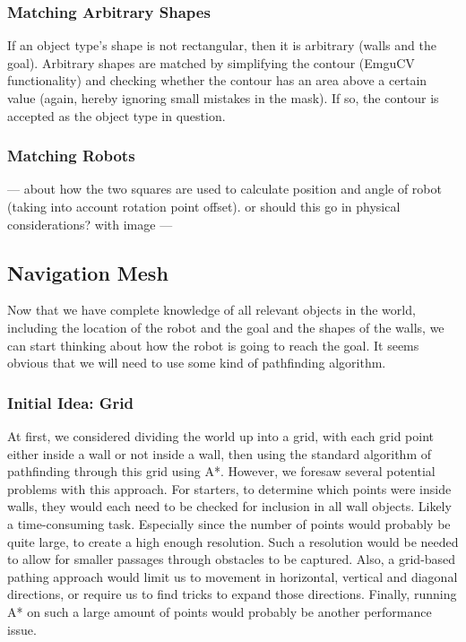 \documentclass[10pt,twocolumn]{scrartcl}
\begin{document}
\subsubsection{Matching Arbitrary Shapes}
If an object type's shape is not rectangular, then it is arbitrary (walls and the goal). Arbitrary shapes are matched by simplifying the contour (EmguCV functionality) and checking whether the contour has an area above a certain value (again, hereby ignoring small mistakes in the mask). If so, the contour is accepted as the object type in question.

\subsubsection{Matching Robots}
---
about how the two squares are used to calculate position and angle of robot (taking into account rotation point offset). or should this go in physical considerations? with image
---

\subsection{Navigation Mesh}
Now that we have complete knowledge of all relevant objects in the world, including the location of the robot and the goal and the shapes of the walls, we can start thinking about how the robot is going to reach the goal. It seems obvious that we will need to use some kind of pathfinding algorithm.

\subsubsection{Initial Idea: Grid}
At first, we considered dividing the world up into a grid, with each grid point either inside a wall or not inside a wall, then using the standard algorithm of pathfinding through this grid using A*. However, we foresaw several potential problems with this approach. For starters, to determine which points were inside walls, they would each need to be checked for inclusion in all wall objects. Likely a time-consuming task. Especially since the number of points would probably be quite large, to create a high enough resolution. Such a resolution would be needed to allow for smaller passages through obstacles to be captured. Also, a grid-based pathing approach would limit us to movement in horizontal, vertical and diagonal directions, or require us to find tricks to expand those directions. Finally, running A* on such a large amount of points would probably be another performance issue.
\end{document}
